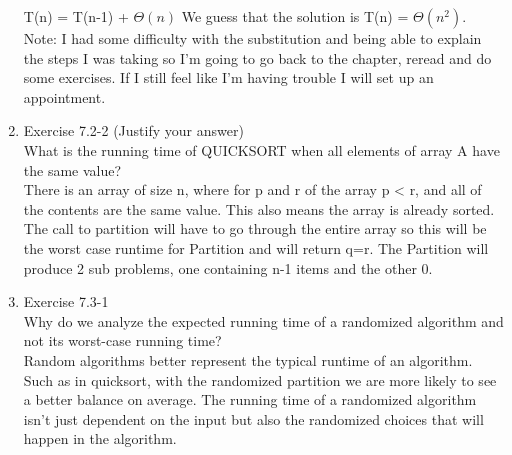 \documentclass[12pt]{article}
\begin{document}
\begin{enumerate}
T(n) = T(n-1) + $\Theta(n)$ We guess that the solution is T(n) = $\Theta(n^2)$. \\

Note: I had some difficulty with the substitution and being able to explain the steps I was taking so I'm going to go back to the chapter, reread and do some exercises. If I still feel like I'm having trouble I will set up an appointment.

\item Exercise 7.2-2 (Justify your answer) \\
What is the running time of QUICKSORT when all elements of array A have the same value? \\

There is an array of size n, where for p and r of the array p < r, and all of the contents are the same value. This also means the array is already sorted. The call to partition will have to go through the entire array so this will be the worst case runtime for Partition and will return q=r. The Partition will produce 2 sub problems, one containing n-1 items and the other 0.

\item Exercise 7.3-1 \\
Why do we analyze the expected running time of a randomized algorithm and not its worst-case running time? \\

Random algorithms better represent the typical runtime of an algorithm. Such as in quicksort, with the randomized partition we are more likely to see a better balance on average. The running time of a randomized algorithm isn't just dependent on the input but also the randomized choices that will happen in the algorithm.

\end{enumerate}
 

 
\end{document}
